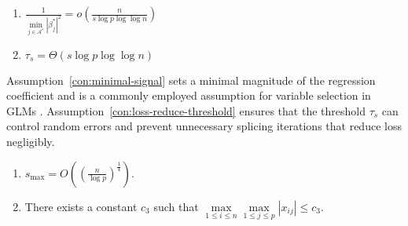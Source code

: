 \begin{enumerate}[label=(A\arabic*), start=5]
\item $\frac{1}{\min\limits_{j\in \mathcal{A}^*} |\beta_j^*|^2} = o \left(\frac{ n}{s\log p\log\log n}\right)$ \label{con:minimal-signal}
\item $\tau_s = \Theta \left({s\log p\log\log n}\right)$ \label{con:loss-reduce-threshold}
\end{enumerate}
Assumption~\ref{con:minimal-signal} sets a minimal magnitude of the regression coefficient and is a commonly employed assumption for variable selection in GLMs \citep{fan2013tuning}. Assumption~\ref{con:loss-reduce-threshold} ensures that the threshold $\tau_s$ can control random errors and prevent unnecessary splicing iterations that reduce loss negligibly. %
\begin{enumerate}[label=(A\arabic*), start=7]
\item $s_{\max} = O\left((\frac{{n}}{\log p})^{\frac{1}{4}}\right)$. \label{con:maximum-size}
\item There exists a constant $c_3$ such that $\max\limits_{1\leq i \leq n}\max\limits_{1\leq j \leq p} |x_{ij}| \leq c_3$. \label{con:x_bound}
\end{enumerate}
